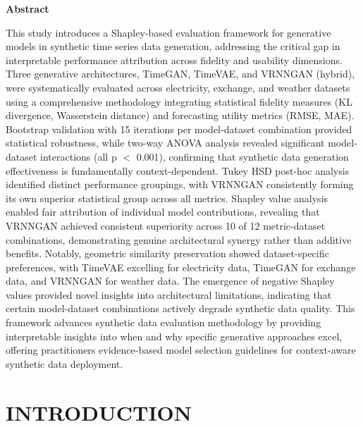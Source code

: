 \documentclass[11pt]{article}
\begin{document}
\newpage

\begin{center}
\Large\textbf{Abstract}
\end{center}

\vspace{1em} %

This study introduces a Shapley-based evaluation framework for generative models in synthetic time series data generation, addressing the critical gap in interpretable performance attribution across fidelity and usability dimensions. Three generative architectures, TimeGAN, TimeVAE, and VRNNGAN (hybrid), were systematically evaluated across electricity, exchange, and weather datasets using a comprehensive methodology integrating statistical fidelity measures (KL divergence, Wasserstein distance) and forecasting utility metrics (RMSE, MAE). Bootstrap validation with 15 iterations per model-dataset combination provided statistical robustness, while two-way ANOVA analysis revealed significant model-dataset interactions (all p $<$ 0.001), confirming that synthetic data generation effectiveness is fundamentally context-dependent. Tukey HSD post-hoc analysis identified distinct performance groupings, with VRNNGAN consistently forming its own superior statistical group across all metrics. Shapley value analysis enabled fair attribution of individual model contributions, revealing that VRNNGAN achieved consistent superiority across 10 of 12 metric-dataset combinations, demonstrating genuine architectural synergy rather than additive benefits. Notably, geometric similarity preservation showed dataset-specific preferences, with TimeVAE excelling for electricity data, TimeGAN for exchange data, and VRNNGAN for weather data. The emergence of negative Shapley values provided novel insights into architectural limitations, indicating that certain model-dataset combinations actively degrade synthetic data quality. This framework advances synthetic data evaluation methodology by providing interpretable insights into when and why specific generative approaches excel, offering practitioners evidence-based model selection guidelines for context-aware synthetic data deployment.

\newpage
\tableofcontents
\newpage

\listoffigures
\newpage

\listoftables
\newpage

\setcounter{page}{1}
\section{INTRODUCTION}
\end{document}
